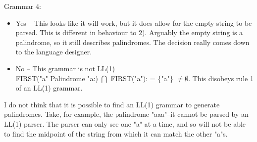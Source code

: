 \documentclass[a4paper,12pt]{article}
\newlength{\QNo}
\begin{document}
\begin{minipage}[t]{0.95\dimexpr\textwidth}
  Grammar 4:\\
  \begin{minipage}[t]{0.9\dimexpr\textwidth-\QNo}
    \begin{itemize}
    \item
    Yes -- This looks like it will work, but it does allow for the empty string to be parsed. This is different in behaviour to 2). Arguably the empty string is a palindrome, so it still describes palindromes. The decision really comes down to the language designer.
    \item
    No -- This grammar is not LL(1)\\
    FIRST("a" Palindrome "a:) $\bigcap$ FIRST("a"): = \{"a"\} $\neq \emptyset$.
    This disobeys rule 1 of an LL(1) grammar.\\
    \end{itemize}
  \end{minipage}

  I do not think that it is possible to find an LL(1) grammar to generate palindromes. Take, for example, the palindrome "aaa"--it cannot be parsed by an LL(1) parser. The parser can only see one "a" at a time, and so will not be able to find the midpoint of the string from which it can match the other "a"s.\\

\end{minipage}
\end{document}
